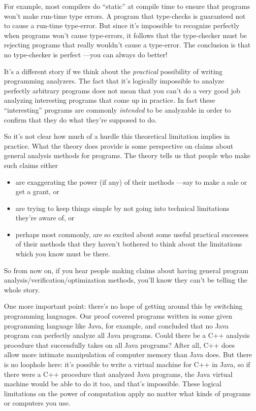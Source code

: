 For example, most compilers do ``static''  at compile
time to ensure that programs won't make run-time type errors.  A program
that type-checks is guaranteed not to cause a run-time type-error.  But
since it's impossible to recognize perfectly when programs won't cause
type-errors, it follows that the type-checker must be rejecting programs
that really wouldn't cause a type-error.  The conclusion is that no
type-checker is perfect ---you can always do better!

It's a different story if we think about the \emph{practical}
possibility of writing programming analyzers.  The fact that it's
logically impossible to analyze perfectly arbitrary programs does not
mean that you can't do a very good job analyzing interesting programs
that come up in practice.  In fact these ``interesting'' programs are
commonly \emph{intended} to be analyzable in order to confirm that
they do what they're supposed to do.

So it's not clear how much of a hurdle this theoretical limitation
implies in practice.  What the theory does provide is some perspective
on claims about general analysis methods for programs.  The theory
tells us that people who make such claims either

\begin{itemize}
\item are exaggerating the power (if any) of their methods ---say to make a
  sale or get a grant, or

\item are trying to keep things simple by not going into technical
  limitations they're aware of, or

\item perhaps most commonly, are so excited about some useful practical
    successes of their methods that they haven't bothered to think about
    the limitations which you know must be there.
\end{itemize}

So from now on, if you hear people making claims about having general
program analysis/verification/optimization methods, you'll know they can't
be telling the whole story.

One more important point: there's no hope of getting around this by
switching programming languages.  Our proof covered programs written
in some given programming language like Java, for example, and
concluded that no Java program can perfectly analyze all Java
programs.  Could there be a C++ analysis procedure that successfully
takes on all Java programs?  After all, C++ does allow more intimate
manipulation of computer memory than Java does.  But there is no
loophole here: it's possible to write a virtual machine for C++ in
Java, so if there were a C++ procedure that analyzed Java programs,
the Java virtual machine would be able to do it too, and that's
impossible.  These logical limitations on the power of computation
apply no matter what kinds of programs or computers you use.

